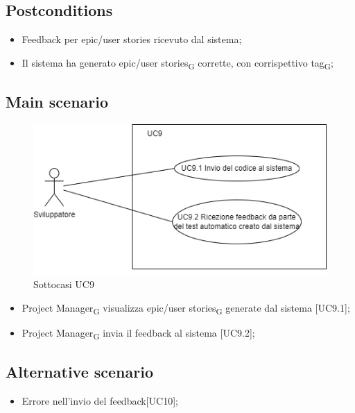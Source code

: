 \documentclass{article}
\begin{document}
    \subsection*{Postconditions}
        \begin{itemize}
            \item Feedback per epic/user stories ricevuto dal sistema;
            \item Il sistema ha generato epic/user stories\textsubscript{G} corrette, con corrispettivo tag\textsubscript{G};
        \end{itemize}
        
    \subsection*{Main scenario}
        \begin{figure}[h]
          \centering
          \includegraphics{./imgUML/UC9-zoom.png}
          \caption{Sottocasi UC9}
          \label{fig:UC9_sottocasi}
        \end{figure}

        \begin{itemize}
            \item Project Manager\textsubscript{G} visualizza epic/user stories\textsubscript{G} generate dal sistema [UC9.1];
            \item Project Manager\textsubscript{G} invia il feedback al sistema [UC9.2];
        \end{itemize}
        
    \subsection*{Alternative scenario}
        
        \begin{itemize}
            \item Errore nell'invio del feedback[UC10];
        \end{itemize}
        
\end{document}

